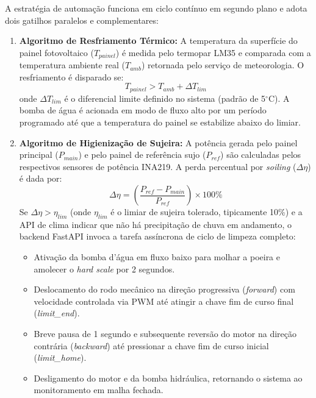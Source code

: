 \documentclass[12pt, a4paper]{article}
\begin{document}
A estratégia de automação funciona em ciclo contínuo em segundo plano e adota dois gatilhos paralelos e complementares:
\begin{enumerate}
    \item \textbf{Algoritmo de Resfriamento Térmico:} A temperatura da superfície do painel fotovoltaico ($T_{painel}$) é medida pelo termopar LM35 e comparada com a temperatura ambiente real ($T_{amb}$) retornada pelo serviço de meteorologia. O resfriamento é disparado se:
    \begin{equation}
        T_{painel} > T_{amb} + \Delta T_{lim}
    \end{equation}
    onde $\Delta T_{lim}$ é o diferencial limite definido no sistema (padrão de 5$^\circ$C). A bomba de água é acionada em modo de fluxo alto por um período programado até que a temperatura do painel se estabilize abaixo do limiar.
    \item \textbf{Algoritmo de Higienização de Sujeira:} A potência gerada pelo painel principal ($P_{main}$) e pelo painel de referência sujo ($P_{ref}$) são calculadas pelos respectivos sensores de potência INA219. A perda percentual por \textit{soiling} ($\Delta \eta$) é dada por:
    \begin{equation}
        \Delta \eta = \left( \frac{P_{ref} - P_{main}}{P_{ref}} \right) \times 100\%
    \end{equation}
    Se $\Delta \eta > \eta_{lim}$ (onde $\eta_{lim}$ é o limiar de sujeira tolerado, tipicamente 10\%) e a API de clima indicar que não há precipitação de chuva em andamento, o backend FastAPI invoca a tarefa assíncrona de ciclo de limpeza completo:
    \begin{itemize}
        \item Ativação da bomba d'água em fluxo baixo para molhar a poeira e amolecer o \textit{hard scale} por 2 segundos.
        \item Deslocamento do rodo mecânico na direção progressiva (\textit{forward}) com velocidade controlada via PWM até atingir a chave fim de curso final (\textit{limit\_end}).
        \item Breve pausa de 1 segundo e subsequente reversão do motor na direção contrária (\textit{backward}) até pressionar a chave fim de curso inicial (\textit{limit\_home}).
        \item Desligamento do motor e da bomba hidráulica, retornando o sistema ao monitoramento em malha fechada.
    \end{itemize}
\end{enumerate}
\end{document}
